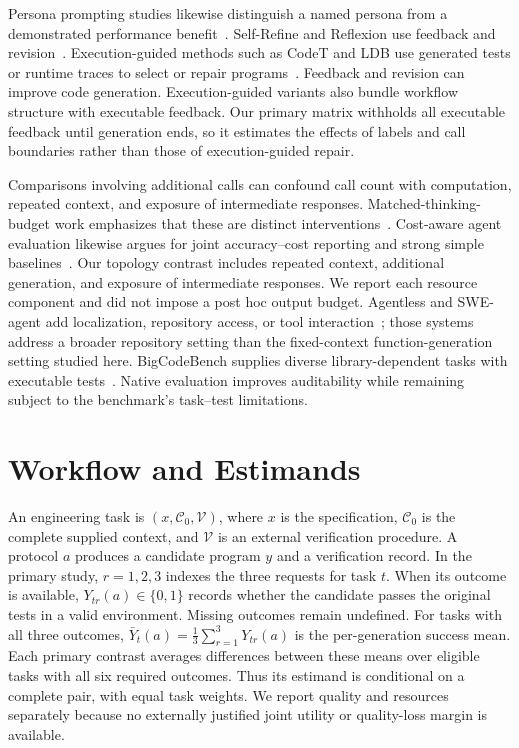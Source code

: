 

Persona prompting studies likewise distinguish a named persona from a demonstrated performance benefit~\citep{zheng2024personas,araujo2025personas}. Self-Refine and Reflexion use feedback and revision~\citep{madaan2023selfrefine,shinn2023reflexion}. Execution-guided methods such as CodeT and LDB use generated tests or runtime traces to select or repair programs~\citep{chen2023codet,zhong2024ldb}. Feedback and revision can improve code generation. Execution-guided variants also bundle workflow structure with executable feedback. Our primary matrix withholds all executable feedback until generation ends, so it estimates the effects of labels and call boundaries rather than those of execution-guided repair.

Comparisons involving additional calls can confound call count with computation, repeated context, and exposure of intermediate responses. Matched-thinking-budget work emphasizes that these are distinct interventions~\citep{tran2026budget}. Cost-aware agent evaluation likewise argues for joint accuracy--cost reporting and strong simple baselines~\citep{kapoor2025agents}. Our topology contrast includes repeated context, additional generation, and exposure of intermediate responses. We report each resource component and did not impose a post hoc output budget. Agentless and SWE-agent add localization, repository access, or tool interaction~\citep{xia2025agentless,yang2024sweagent}; those systems address a broader repository setting than the fixed-context function-generation setting studied here. BigCodeBench supplies diverse library-dependent tasks with executable tests~\citep{zhuo2024bigcodebench}. Native evaluation improves auditability while remaining subject to the benchmark's task--test limitations.

\section{Workflow and Estimands}
An engineering task is $(x,\mathcal{C}_0,\mathcal{V})$, where $x$ is the specification, $\mathcal{C}_0$ is the complete supplied context, and $\mathcal{V}$ is an external verification procedure. A protocol $a$ produces a candidate program $y$ and a verification record. In the primary study, $r=1,2,3$ indexes the three requests for task $t$. When its outcome is available, $Y_{tr}(a)\in\{0,1\}$ records whether the candidate passes the original tests in a valid environment. Missing outcomes remain undefined. For tasks with all three outcomes, $\bar Y_t(a)=\frac{1}{3}\sum_{r=1}^{3}Y_{tr}(a)$ is the per-generation success mean. Each primary contrast averages differences between these means over eligible tasks with all six required outcomes. Thus its estimand is conditional on a complete pair, with equal task weights. We report quality and resources separately because no externally justified joint utility or quality-loss margin is available.

